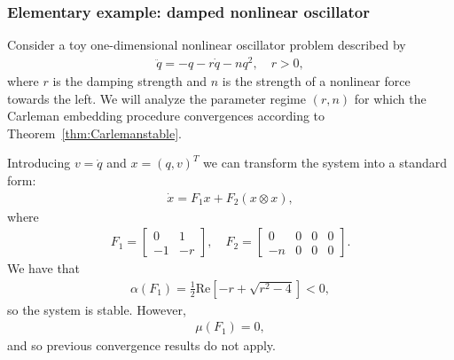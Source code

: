 \documentclass[superscriptaddress,onecolumn,nofootinbib,longbibliography,a4paper,accepted=2026-09-29]{quantumarticle}
\theoremstyle{plain}
\theoremstyle{definition}
\numberwithin{thm}{section}
\numberwithin{assumption}{section}
\numberwithin{lemma}{section}
\numberwithin{prop}{section}
\numberwithin{cor}{section}
\numberwithin{definition}{section}
\numberwithin{rmk}{section}
\numberwithin{equation}{section}
\begin{document}

\subsubsection*{Elementary example: damped nonlinear oscillator}

Consider a toy one-dimensional nonlinear oscillator problem described by
\begin{align}
    \label{eq:toyoscillatorbelow}
    \ddot{q} = - q - r \dot{q} - n q^2, \quad r>0,
\end{align}
where $r$ is the damping strength and $n$ is the strength of a nonlinear force towards the left. We will analyze the parameter regime $(r,n)$ for which the Carleman embedding procedure convergences according to Theorem~\ref{thm:Carlemanstable}.

Introducing $v = \dot{q}$ and $x = (q, v)^T$ we can transform the system into a standard form:
\begin{align}
    \dot{x} = F_1 x + F_2 (x \otimes x),
\end{align}
where
\begin{align}
    F_1 = \begin{bmatrix}
        0 & 1 \\ -1 & -r
    \end{bmatrix}, \quad F_2 = \begin{bmatrix}
        0 & 0 & 0 & 0 \\
        -n & 0 & 0 & 0
    \end{bmatrix}.
\end{align}
We have that
\begin{align}
    \alpha(F_1) = \frac{1}{2} \mathrm{Re} \left[-r + \sqrt{r^2 - 4}\right]< 0,
\end{align}
so the system is stable. However,
\begin{align}
\mu(F_1) = 0,
\end{align}
and so previous convergence results do not apply. 
\end{document}
